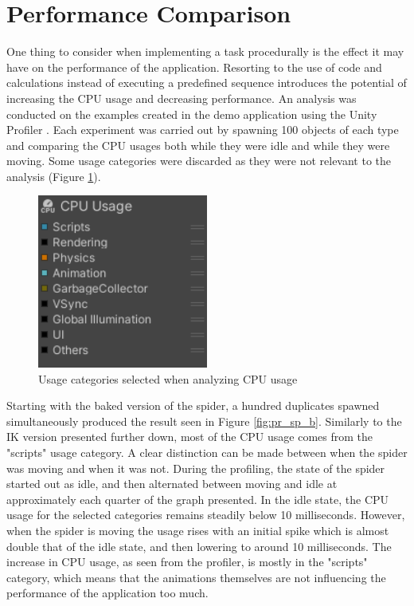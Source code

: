 \section{Performance Comparison}
One thing to consider when implementing a task procedurally is the
effect it may have on the performance of the application. Resorting to the use
of code and calculations instead of executing a predefined sequence introduces
the potential of increasing the CPU usage and decreasing performance. An
analysis was conducted on the examples created in the demo application using the
Unity Profiler \cite{unity_profiler}. Each experiment was carried out by
spawning 100 objects of each type and comparing the CPU usages both while they
were idle and while they were moving. Some usage categories were discarded as
they were not relevant to the analysis (Figure \ref{fig:profiler_settings}).

\begin{figure}[h!]
    \centering
    \captionsetup{justification=centering}
    \includegraphics[width=0.5\textwidth]{grafika/profiler_settings.png}
    \caption{Usage categories selected when analyzing CPU usage}
    \label{fig:profiler_settings}
\end{figure}

Starting with the baked version of the spider, a hundred duplicates spawned
simultaneously produced the result seen in Figure \ref{fig:pr_sp_b}. Similarly
to the IK version presented further down, most of the CPU usage comes from the
"scripts" usage category. A clear distinction can be made between when the
spider was moving and when it was not. During the profiling, the state of the
spider started out as idle, and then alternated between moving and idle at
approximately each quarter of the graph presented. In the idle state, the CPU
usage for the selected categories remains steadily below 10 milliseconds.
However, when the spider is moving the usage rises with an initial spike which
is almost double that of the idle state, and then lowering to around 10
milliseconds. The increase in CPU usage, as seen from the profiler, is mostly in
the "scripts" category, which means that the animations themselves are not
influencing the performance of the application too much.

